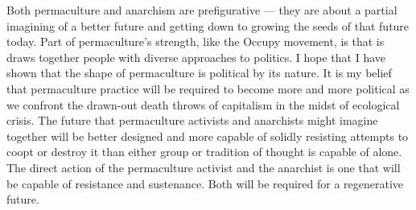 \documentclass[a4paper, 11pt]{article}
\begin{document}
\begin{multicols*}{2}
Both permaculture and anarchism are prefigurative --- they are about a partial imagining of a better future and getting down to growing the seeds of that future today. Part of permaculture's strength, like the Occupy movement, is that is draws together people with diverse approaches to politics.  I hope that I have shown that the shape of permaculture is political by its nature.  It is my belief that permaculture practice will be required to become more and more political as we confront the drawn-out death throws of capitalism in the midst of ecological crisis.  The future that permaculture activists and anarchists might imagine together will be better designed and more capable of solidly resisting attempts to coopt or destroy it than either group or tradition of thought is capable of alone.  The direct action of the permaculture activist and the anarchist is one that will be capable of resistance and sustenance.  Both will be required for a regenerative future.

\begin{comment}
\begin{quote}
\begin{quote}
        ``As the capitalist mode of production enters its worst crisis since the 1930s, peasant and small farmers increasingly present a vision of autonomy, diversity, and cooperation that may just be the key elements of a necessary social and economic reorganisation.'' --- \textsc{Bello and Baviera} --- Food Wars in \textsc{Magdoff and Tokar} --- Agriculture and Food Crisis, p49
\end{quote}

\begin{quote}
    ``Nobody is smart enough to plan a society.  You can talk about some of the principles upon which a society should work, and you can set up guidelines as to how to implement them, and how to experiment with them, and there are probably many different ways of doing them.  There's no reason to believe that there's only one right answer; there are lots of different answers, with advantages and disadvantages, and people have to choose between them on the basis of experience, what has happened to others, and so on.  This is true in every area.'' \textsc{Noam Chomsky} in \textsc{Pannekoek}, Workers' Councils p xi
\end{quote}

    ``Ecologically, bourgeois exploitation and manipulation are undermining the very capacity of the earth to sustain advanced forms of life.'' --- \textsc{Bookchin}, PSA p58
\end{quote}


\end{comment}
\end{multicols*}
\end{document}

